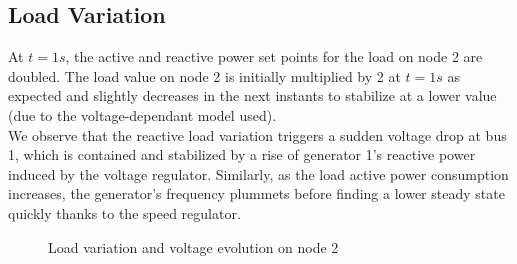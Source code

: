 \documentclass[a4paper, 12pt]{report}
\begin{document}
\newpage
\subsection{Load Variation}
\label{LoadVariation}

At $t=1s$, the active and reactive power set points for the load on node 2 are doubled. The load value on node 2 is initially multiplied by 2 at $t=1s$ as expected and slightly decreases in the next instants to stabilize at a lower value (due to the voltage-dependant model used). \\

We observe that the reactive load variation triggers a sudden voltage drop at bus 1, which is contained and stabilized by a rise of generator 1's reactive power induced by the voltage regulator. Similarly, as the load active power consumption increases, the generator's frequency plummets before finding a lower steady state quickly thanks to the speed regulator.\\

\begin{figure}[H]
\caption{Load variation and voltage evolution on node 2}
\end{figure}
\end{document}
